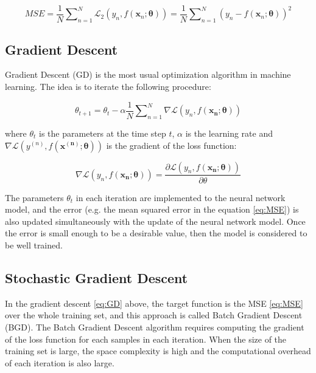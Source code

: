 \documentclass[
	parskip, 			   %
	twoside, 			   %
	DIV=14, 			   %
	BCOR=15.0mm, 		   %
	headsepline, 		   %
	open=right, 		   %
	captions=tableheading, %
	bibliography=totoc,    %
	numbers=noenddot       %
]{scrreprt}
\begin{document}
\begin{equation}
    \label{eq:MSE}
    MSE = \frac{1}{N} \sum\nolimits_{n=1}^N \mathcal{L}_{2}\left( y_n,f(\mathbf{x}_n;\mathbf{\theta}) \right) = \frac{1}{N} \sum\nolimits_{n=1}^N (y_n-f(\mathbf{x}_n;\mathbf{\theta}))^2
\end{equation}
\subsection{Gradient Descent}
Gradient Descent (GD) is the most usual optimization algorithm in machine learning. The idea is to iterate the following procedure:

\begin{equation}
    \label{eq:GD}
    \theta_{t+1} = \theta_{t} - \alpha \frac{1}{N} \sum\nolimits_{n=1}^N \nabla \mathcal{L}\left( y_{n},f(\mathbf{x_{n}};\mathbf{\theta}) \right)
\end{equation}

where $\theta_{t}$ is the parameters at the time step $t$, $\alpha$ is the learning rate and $\nabla \mathcal{L}\left( y^{(n)},f(\mathbf{x^{(n)}};\mathbf{\theta}) \right)$ is the gradient of the loss function:

\begin{equation}
    \label{eq:Gradient_loss}
    \nabla \mathcal{L}\left( y_{n},f(\mathbf{x_{n}};\mathbf{\theta}) \right) = \frac{\partial \mathcal{L}\left( y_{n},f(\mathbf{x_{n}};\mathbf{\theta}) \right)}{\partial \theta}
\end{equation}

The parameters $\theta_{t}$ in each iteration are implemented to the neural network model, and the error (e.g. the mean squared error in the equation \ref{eq:MSE}) is also updated simultaneously with the update of the neural network model. Once the error is small enough to be a desirable value, then the model is considered to be well trained.

\subsection{Stochastic Gradient Descent}
In the gradient descent \ref{eq:GD} above, the target function is the MSE \ref{eq:MSE} over the whole training set, and this approach is called Batch Gradient Descent (BGD).  The Batch Gradient Descent algorithm requires computing the gradient of the loss function for each samples in each iteration. When the size of the training set is large, the space complexity is high and the computational overhead of each iteration is also large.
\end{document}
